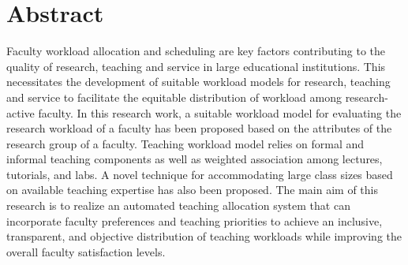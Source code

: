 
\chapter*{Abstract}

Faculty workload allocation and scheduling are key factors contributing to the quality of research, teaching and service in large educational institutions. This necessitates the development of suitable workload models for research, teaching and service to facilitate the equitable distribution of workload among research-active faculty. In this research work, a suitable workload model for evaluating the research workload of a faculty has been proposed based on the attributes of the research group of a faculty. Teaching workload model relies on formal and informal teaching components as well as weighted association among lectures, tutorials, and labs. A novel technique for accommodating large class sizes based on available teaching expertise has also been proposed. The main aim of this research is to realize an automated teaching allocation system that can incorporate faculty preferences and teaching priorities to achieve an inclusive, transparent, and objective distribution of teaching workloads while improving the overall faculty satisfaction levels.


